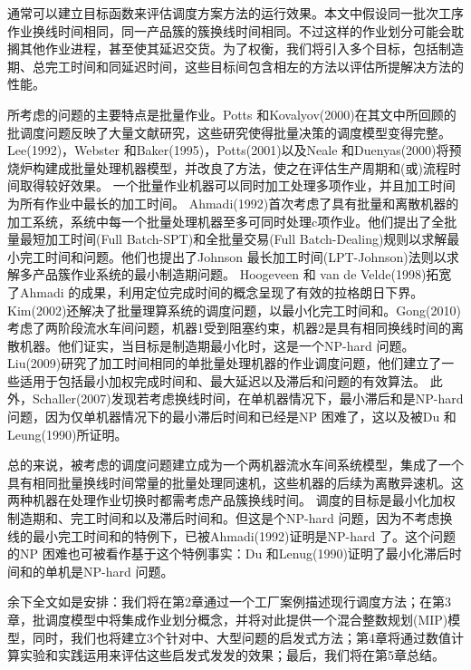 \begin{figure}[h]
\begin{floatrow}[2]
\centering
{}
\end{floatrow}
\end{figure}

通常可以建立目标函数来评估调度方案方法的运行效果。本文中假设同一批次工序作业换线时间相同，同一产品簇的簇换线时间相同。不过这样的作业划分可能会耽搁其他作业进程，甚至使其延迟交货。为了权衡，我们将引入多个目标，包括制造期、总完工时间和同延迟时间，这些目标间包含相左的方法以评估所提解决方法的性能。

所考虑的问题的主要特点是批量作业。Potts 和Kovalyov(2000)在其文中所回顾的批调度问题反映了大量文献研究，这些研究使得批量决策的调度模型变得完整。Lee(1992)，Webster 和Baker(1995)，Potts(2001)以及Neale 和Duenyas(2000)将预烧炉构建成批量处理机器模型，并改良了方法，使之在评估生产周期和(或)流程时间取得较好效果。
一个批量作业机器可以同时加工处理多项作业，并且加工时间为所有作业中最长的加工时间。
Ahmadi(1992)首次考虑了具有批量和离散机器的加工系统，系统中每一个批量处理机器至多可同时处理c项作业。他们提出了全批量最短加工时间(Full Batch-SPT)和全批量交易(Full Batch-Dealing)规则以求解最小完工时间和问题。他们也提出了Johnson 最长加工时间(LPT-Johnson)法则以求解多产品簇作业系统的最小制造期问题。
Hoogeveen 和 van de Velde(1998)拓宽了Ahmadi 的成果，利用定位完成时间的概念呈现了有效的拉格朗日下界。Kim(2002)还解决了批量理算系统的调度问题，以最小化完工时间和。Gong(2010)考虑了两阶段流水车间问题，机器1受到阻塞约束，机器2是具有相同换线时间的离散机器。他们证实，当目标是制造期最小化时，这是一个NP-hard 问题。Liu(2009)研究了加工时间相同的单批量处理机器的作业调度问题，他们建立了一些适用于包括最小加权完成时间和、最大延迟以及滞后和问题的有效算法。
此外，Schaller(2007)发现若考虑换线时间，在单机器情况下，最小滞后和是NP-hard 问题，因为仅单机器情况下的最小滞后时间和已经是NP 困难了，这以及被Du 和Leung(1990)所证明。

总的来说，被考虑的调度问题建立成为一个两机器流水车间系统模型，集成了一个具有相同批量换线时间常量的批量处理同速机，这些机器的后续为离散异速机。这两种机器在处理作业切换时都需考虑产品簇换线时间。
调度的目标是最小化加权制造期和、完工时间和以及滞后时间和。但这是个NP-hard 问题，因为不考虑换线的最小完工时间和的特例下，已被Ahmadi(1992)证明是NP-hard 了。这个问题的NP 困难也可被看作基于这个特例事实：Du 和Lenug(1990)证明了最小化滞后时间和的单机是NP-hard 问题。

余下全文如是安排：我们将在第2章通过一个工厂案例描述现行调度方法；在第3章，批调度模型中将集成作业划分概念，并将对此提供一个混合整数规划(MIP)模型，同时，我们也将建立3个针对中、大型问题的启发式方法；第4章将通过数值计算实验和实践运用来评估这些启发式发发的效果；最后，我们将在第5章总结。



